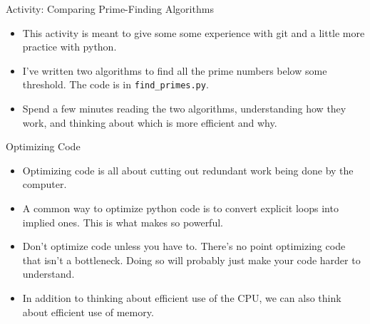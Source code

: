 \begin{frame}{Activity: Comparing Prime-Finding Algorithms}

 \begin{itemize}
   
  \item This activity is meant to give some some experience with git and a 
   little more practice with python.

  \item I've written two algorithms to find all the prime numbers below some 
  threshold.  The code is in \texttt{find\_primes.py}.

  \item Spend a few minutes reading the two algorithms, understanding how they 
   work, and thinking about which is more efficient and why.

 \end{itemize}

\end{frame}

\begin{frame}{Optimizing Code}

 \begin{itemize}

  \item Optimizing code is all about cutting out redundant work being done by 
   the computer.

  \item A common way to optimize python code is to convert explicit loops into 
   implied ones.  This is what makes  so powerful.

  \item Don't optimize code unless you have to.  There's no point optimizing 
   code that isn't a bottleneck.  Doing so will probably just make your code 
   harder to understand.

  \item In addition to thinking about efficient use of the CPU, we can also 
   think about efficient use of memory.

 \end{itemize}

\end{frame}

